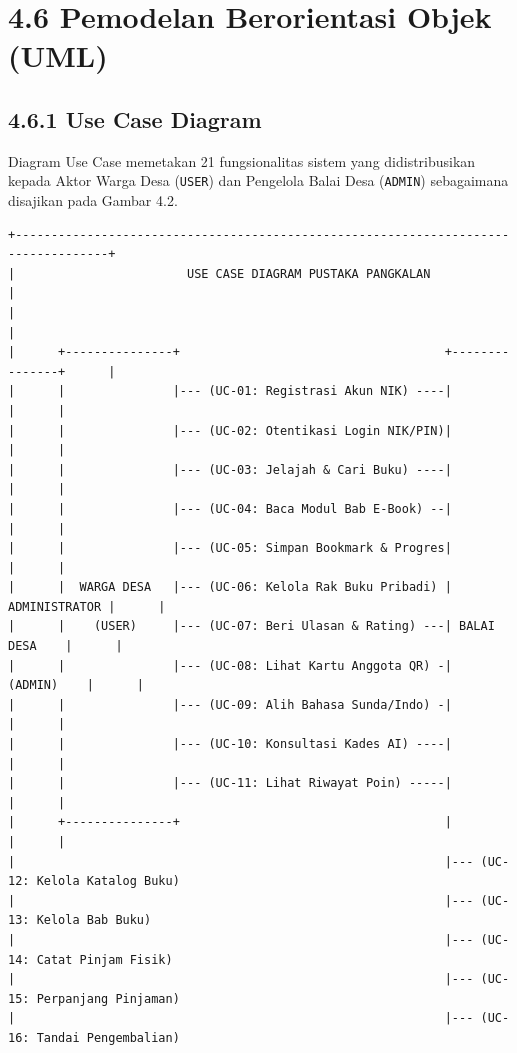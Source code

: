 \documentclass[
  indonesian,
  12pt,
]{report}
\begin{document}
\section{4.6 Pemodelan Berorientasi Objek
(UML)}\label{pemodelan-berorientasi-objek-uml}

\subsection{4.6.1 Use Case Diagram}\label{use-case-diagram}

Diagram Use Case memetakan 21 fungsionalitas sistem yang didistribusikan
kepada Aktor Warga Desa (\texttt{USER}) dan Pengelola Balai Desa
(\texttt{ADMIN}) sebagaimana disajikan pada Gambar 4.2.

\begin{verbatim}
+-----------------------------------------------------------------------------------+
|                        USE CASE DIAGRAM PUSTAKA PANGKALAN                         |
|                                                                                   |
|      +---------------+                                     +---------------+      |
|      |               |--- (UC-01: Registrasi Akun NIK) ----|               |      |
|      |               |--- (UC-02: Otentikasi Login NIK/PIN)|               |      |
|      |               |--- (UC-03: Jelajah & Cari Buku) ----|               |      |
|      |               |--- (UC-04: Baca Modul Bab E-Book) --|               |      |
|      |               |--- (UC-05: Simpan Bookmark & Progres|               |      |
|      |  WARGA DESA   |--- (UC-06: Kelola Rak Buku Pribadi) | ADMINISTRATOR |      |
|      |    (USER)     |--- (UC-07: Beri Ulasan & Rating) ---| BALAI DESA    |      |
|      |               |--- (UC-08: Lihat Kartu Anggota QR) -|    (ADMIN)    |      |
|      |               |--- (UC-09: Alih Bahasa Sunda/Indo) -|               |      |
|      |               |--- (UC-10: Konsultasi Kades AI) ----|               |      |
|      |               |--- (UC-11: Lihat Riwayat Poin) -----|               |      |
|      +---------------+                                     |               |      |
|                                                            |--- (UC-12: Kelola Katalog Buku)
|                                                            |--- (UC-13: Kelola Bab Buku)
|                                                            |--- (UC-14: Catat Pinjam Fisik)
|                                                            |--- (UC-15: Perpanjang Pinjaman)
|                                                            |--- (UC-16: Tandai Pengembalian)

\end{verbatim}
\end{document}
